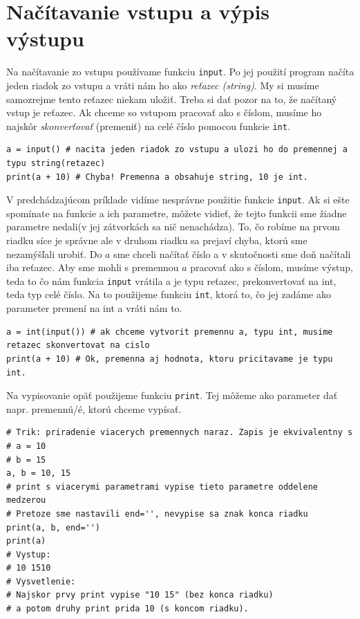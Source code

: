 \section{Načítavanie vstupu a výpis výstupu}


Na načítavanie zo vstupu používame funkciu \texttt{input}. Po jej použití program načíta jeden riadok zo vstupu
a vráti nám ho ako \textit{reťazec (string)}. My si musíme samozrejme tento reťazec niekam uložiť. Treba si dať pozor na to, že načítaný vstup je reťazec. Ak chceme so vstupom pracovať ako s číslom, musíme ho najskôr \textit{skonverťovať} (premeniť) na celé číslo pomocou funkcie \texttt{int}.

\begin{lstlisting}
a = input() # nacita jeden riadok zo vstupu a ulozi ho do premennej a typu string(retazec)
print(a + 10) # Chyba! Premenna a obsahuje string, 10 je int.
\end{lstlisting}

V predchádzajúcom príklade vidíme nesprávne použitie funkcie \texttt{input}. Ak si ešte spomínate na funkcie a ich parametre, môžete vidieť, že tejto funkcii sme žiadne parametre nedali(v jej zátvorkách sa nič nenachádza). To, čo robíme na prvom riadku síce je správne ale v druhom riadku sa prejaví chyba, ktorú sme nezamýšľali urobiť. Do $a$ sme chceli načítať číslo a v skutočnosti sme doň načítali iba reťazec. Aby sme mohli s premennou $a$ pracovať ako s číslom, musíme výstup, teda to čo nám funkcia \texttt{input} vrátila a je typu reťazec, prekonvertovať na int, teda typ celé číslo. Na to použijeme funkciu \texttt{int}, ktorá to, čo jej zadáme ako parameter premení na int a vráti nám to.

\begin{lstlisting}
a = int(input()) # ak chceme vytvorit premennu a, typu int, musime retazec skonvertovat na cislo
print(a + 10) # Ok, premenna aj hodnota, ktoru pricitavame je typu int.
\end{lstlisting}

Na vypisovanie opäť použijeme funkciu \texttt{print}.
Tej môžeme ako parameter dať napr. premennú/é, ktorú chceme vypísať.

\begin{lstlisting}
# Trik: priradenie viacerych premennych naraz. Zapis je ekvivalentny s
# a = 10
# b = 15
a, b = 10, 15
# print s viacerymi parametrami vypise tieto parametre oddelene medzerou
# Pretoze sme nastavili end='', nevypise sa znak konca riadku
print(a, b, end='')
print(a)
# Vystup:
# 10 1510
# Vysvetlenie:
# Najskor prvy print vypise "10 15" (bez konca riadku)
# a potom druhy print prida 10 (s koncom riadku).
\end{lstlisting}

